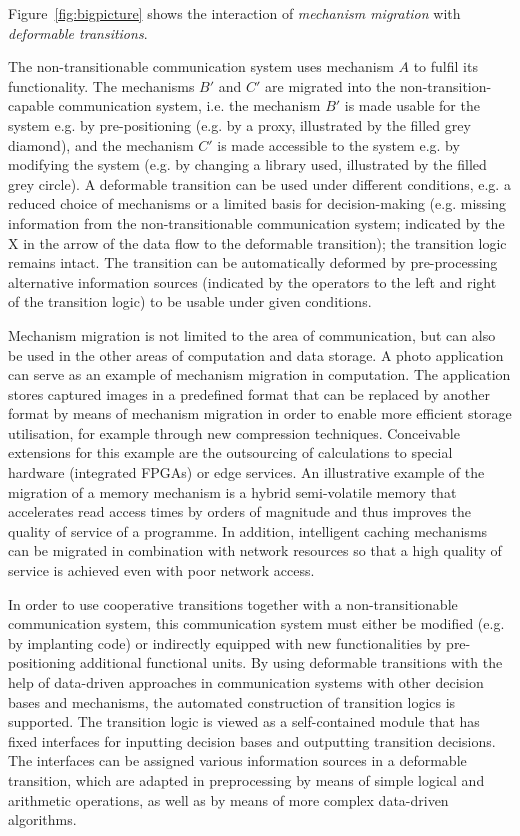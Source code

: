 Figure~\ref{fig:bigpicture} shows the interaction of \emph{mechanism migration} with \textit{deformable transitions}.



The non-transitionable communication system uses mechanism $A$ to fulfil its functionality.
The mechanisms $B'$ and $C'$ are migrated into the non-transition-capable communication system, i.e. the mechanism $B'$ is made usable for the system e.g. by pre-positioning (e.g. by a proxy, illustrated by the filled grey diamond), and  
the mechanism $C'$ is made accessible to the system e.g. by modifying the system (e.g. by changing a library used, illustrated by the filled grey circle).
A deformable transition can be used under different conditions, e.g. a reduced choice of mechanisms or a limited basis for decision-making (e.g. missing information from the non-transitionable communication system; indicated by the X in the arrow of the data flow to the deformable transition); the transition logic remains intact. 
The transition can be automatically deformed by pre-processing alternative information sources (indicated by the operators to the left and right of the transition logic) to be usable under given conditions. 

Mechanism migration is not limited to the area of communication, but can also be used in the other areas of computation and data storage.
A photo application can serve as an example of mechanism migration in computation.
The application stores captured images in a predefined format that can be replaced by another format by means of mechanism migration in order to enable more efficient storage utilisation, for example through new compression techniques. 
Conceivable extensions for this example are the outsourcing of calculations to special hardware (integrated FPGAs) or edge services.
An illustrative example of the migration of a memory mechanism is a hybrid semi-volatile memory that accelerates read access times by orders of magnitude and thus improves the quality of service of a programme. 
In addition, intelligent caching mechanisms can be migrated in combination with network resources so that a high quality of service is achieved even with poor network access. 

In order to use cooperative transitions together with a non-transitionable communication system, this communication system must either be modified (e.g. by implanting code) or indirectly equipped with new functionalities by pre-positioning additional functional units. 
By using deformable transitions with the help of data-driven approaches in communication systems with other decision bases and mechanisms, the automated construction of transition logics is supported. 
The transition logic is viewed as a self-contained module that has fixed interfaces for inputting decision bases and outputting transition decisions.
The interfaces can be assigned various information sources in a deformable transition, which are adapted in preprocessing by means of simple logical and arithmetic operations, as well as by means of more complex data-driven algorithms.
